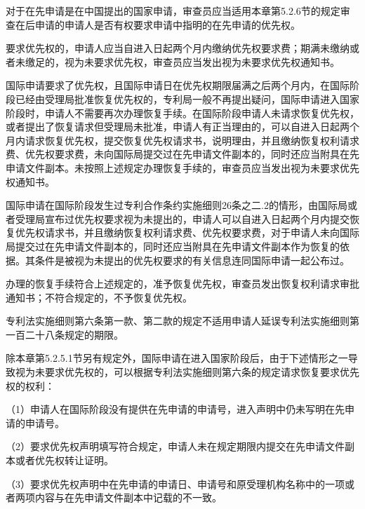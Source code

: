 对于在先申请是在中国提出的国家申请，审查员应当适用本章第5.2.6节的规定审查在后申请的申请人是否有权要求申请中指明的在先申请的优先权。

要求优先权的，申请人应当自进入日起两个月内缴纳优先权要求费；期满未缴纳或者未缴足的，视为未要求优先权，审查员应当发出视为未要求优先权通知书。

国际申请要求了优先权，且国际申请日在优先权期限届满之后两个月内，在国际阶段已经由受理局批准恢复优先权的，专利局一般不再提出疑问，国际申请进入国家阶段时，申请人不需要再次办理恢复手续。在国际阶段申请人未请求恢复优先权，或者提出了恢复请求但受理局未批准，申请人有正当理由的，可以自进入日起两个月内请求恢复优先权，提交恢复优先权请求书，说明理由，并且缴纳恢复权利请求费、优先权要求费，未向国际局提交过在先申请文件副本的，同时还应当附具在先申请文件副本。未按照上述规定办理恢复手续的，审查员应当发出视为未要求优先权通知书。

国际申请在国际阶段发生过专利合作条约实施细则26条之二.2的情形，由国际局或者受理局宣布过优先权要求视为未提出的，申请人可以自进入日起两个月内提交恢复优先权请求书，并且缴纳恢复权利请求费、优先权要求费，对于申请人未向国际局提交过在先申请文件副本的，同时还应当附具在先申请文件副本作为恢复的依据。其条件是被视为未提出的优先权要求的有关信息连同国际申请一起公布过。

办理的恢复手续符合上述规定的，准予恢复优先权，审查员发出恢复权利请求审批通知书；不符合规定的，不予恢复优先权。

专利法实施细则第六条第一款、第二款的规定不适用申请人延误专利法实施细则第一百二十八条规定的期限。

除本章第5.2.5.1节另有规定外，国际申请在进入国家阶段后，由于下述情形之一导致视为未要求优先权的，可以根据专利法实施细则第六条的规定请求恢复要求优先权的权利：

{\setlength{\parindent}{17.8bp}（1）申请人在国际阶段没有提供在先申请的申请号，进入声明中仍未写明在先申请的申请号。\par}

{\setlength{\parindent}{17.8bp}（2）要求优先权声明填写符合规定，申请人未在规定期限内提交在先申请文件副本或者优先权转让证明。\par}

{\setlength{\parindent}{17.8bp}（3）要求优先权声明中在先申请的申请日、申请号和原受理机构名称中的一项或者两项内容与在先申请文件副本中记载的不一致。\par}

